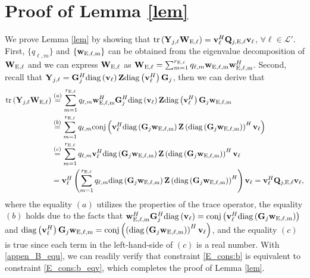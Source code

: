 \documentclass[12pt,draftclsnofoot, onecolumn]{IEEEtran}
\theoremstyle{plain}
\begin{document}
\begin{sloppypar}
\section{Proof of Lemma \ref{lem}} \label{Appen_B}
We prove Lemma \ref{lem} by showing that ${\rm tr}\left(\mathbf Y_{j,\ell}\mathbf W_{\mathrm E,\ell} \right) = \mathbf v_{\ell}^H\mathbf Q_{j,\mathrm E, \ell}\mathbf v_{\ell}$, $\forall \ell\in\mathcal L'$. First, $\{q_{\ell,m}\}$ and $\{\mathbf w_{\rm E,\ell,m}\}$ can be obtained from the eigenvalue decomposition of $\mathbf W_{\rm E, \ell}$ and we can express $\mathbf W_{\rm E, \ell}$ as $\mathbf W_{\rm E,\ell} = \sum_{m=1}^{r_{\rm E,\ell}}q_{\ell,m}\mathbf w_{\rm E,\ell,m}\mathbf w_{\rm E,\ell,m}^H$. Second, recall that $\mathbf Y_{j,\ell} = \mathbf G_j^H{\rm diag}\left(\mathbf v_\ell\right)\mathbf Z{\rm diag}\left(\mathbf v_{\ell}^H\right)\mathbf G_j$, then we can derive that
\begin{align}\label{appen_B_equ}
{\rm tr}\left(\mathbf Y_{j,\ell} \mathbf W_{\rm E,\ell}\right) & \overset{(a)}{=} \sum_{m=1}^{r_{\rm E,\ell}}q_{\ell,m}\mathbf w_{\rm E,\ell,m}^H\mathbf G_j^H{\rm diag}\left(\mathbf v_\ell\right)\mathbf Z{\rm diag}\left(\mathbf v_{\ell}^H\right)\mathbf G_j\mathbf w_{\rm E,\ell,m}\nonumber\\
& \overset{(b)}{=} \sum_{m=1}^{r_{\rm E,\ell}}q_{\ell,m}{\rm conj}\left(\mathbf v_{\ell}^H{\rm diag}\left(\mathbf G_j\mathbf w_{\rm E,\ell,m}\right)\mathbf Z\left( {\rm diag}\left(\mathbf G_j\mathbf w_{\rm E,\ell,m}\right)\right)^H\mathbf v_{\ell}\right) \nonumber\\
& \overset{(c)}{=} \sum_{m=1}^{r_{\rm E,\ell}}q_{\ell,m}\mathbf v_{\ell}^H{\rm diag}\left(\mathbf G_j\mathbf w_{\rm E,\ell,m}\right)\mathbf Z\left( {\rm diag}\left(\mathbf G_j\mathbf w_{\rm E,\ell,m}\right)\right)^H\mathbf v_{\ell} \nonumber\\
& = \mathbf v_{\ell}^H\left(\sum_{m=1}^{r_{\rm E,\ell}}q_{\ell,m}{\rm diag}\left(\mathbf G_j\mathbf w_{\rm E,\ell,m}\right)\mathbf Z\left( {\rm diag}\left(\mathbf G_j\mathbf w_{\rm E,\ell,m}\right)\right)^H\right)\mathbf v_{\ell} = \mathbf v_{\ell}^H\mathbf Q_{j,\mathrm E, \ell}\mathbf v_{\ell},
\end{align}
where the equality $(a)$ utilizes the properties of the trace operator, the equality $(b)$ holds due to the facts that $\mathbf w_{\rm E,\ell,m}^H\mathbf G_j^H{\rm diag}\left(\mathbf v_\ell\right) = {\rm conj}\left(\mathbf v_{\ell}^H{\rm diag}\left(\mathbf G_j\mathbf w_{\rm E,\ell,m}\right)\right)$ and ${\rm diag}\left(\mathbf v_{\ell}^H\right)\mathbf G_j\mathbf w_{\rm E,\ell,m} = {\rm conj}\left( \left( {\rm diag}\left(\mathbf G_j\mathbf w_{\rm E,\ell,m}\right)\right)^H\mathbf v_{\ell}\right)$, and the equality $(c)$ is true since each term in the left-hand-side of $(c)$ is a real number. With \eqref{appen_B_equ}, we can readily verify that constraint \eqref{E_cons:b} is equivalent to constraint \eqref{E_cons:b_eqv}, which completes the proof of Lemma \ref{lem}. 

\vspace{1mm}



\end{sloppypar}
\end{document}
